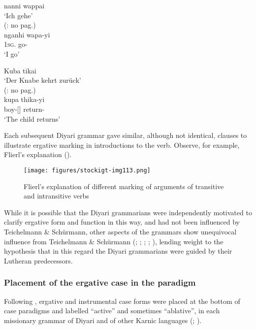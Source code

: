 \ea\label{bkm:Ref329630508}
	nanni wappai \\
	\glt `Ich gehe' \\
	(\citealt{koch_untitled_1868}: no pag.) \\
	\gll nganhi wapa-yi\\
	1\textsc{sg}. go-\\
	\glt `I go'
\z

\ea\label{bkm:Ref329630522}
	Kuba tikai \\
	\glt `Der Knabe kehrt zurück' \\
	(\citealt{koch_untitled_1868}: no pag.) \\
	\gll kupa thika-yi\\
	boy-[] return-\\
	\glt `The child returns'
\z

Each subsequent Diyari grammar gave similar, although not identical, clauses to illustrate ergative marking in introductions to the verb. Observe, for example, Flierl’s explanation ().


\begin{figure}
\texttt{[image: figures/stockigt-img113.png]}
\caption{Flierl’s explanation of different marking of arguments of transitive and intransitive verbs \citeyearpar[32]{flierl_christianieli_1880}}
\label{bkm:Ref449368374}\label{fig:key:164}
\end{figure}

While it is possible that the Diyari grammarians were independently motivated to clarify ergative form and function in this way, and had not been influenced by Teichelmann \& Schürmann, other aspects of the grammars show unequivocal influence from Teichelmann \& Schürmann (\citeyear{teichelmann_outlines_1840}; ; ; ; ), lending weight to the hypothesis that in this regard the Diyari grammarians were guided by their Lutheran predecessors.

\subsubsection{Placement of the ergative case in the paradigm}
\label{sec:key:8.5.2.1}\label{bkm:Ref326949499}
Following \citet{koch_untitled_1868}, ergative and instrumental case forms were placed at the bottom of case paradigms and labelled “active” and sometimes “ablative'', in each missionary grammar of Diyari and of other Karnic languages (; ).

